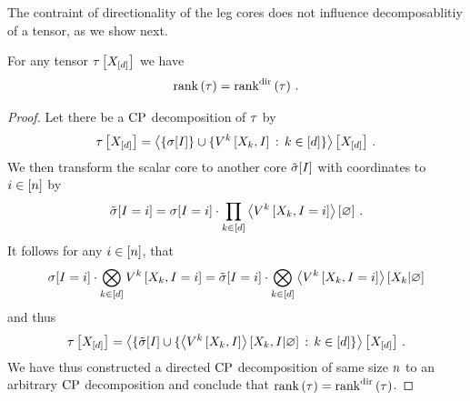 
The contraint of directionality of the leg cores does not influence decomposablitiy of a tensor, as we show next.

\begin{lemma}
    \label{lem:cprankEqualsDir}
    For any tensor $\tau\left[X_{[d]}\right]$ we have
    \begin{align*}
        \mathrm{rank}\left(\tau\right) = \mathrm{rank}^{\mathrm{dir}}\left(\tau\right) \, .
    \end{align*}
\end{lemma}
\begin{proof}
    Let there be a $\mathrm{CP}$ decomposition of $\tau$ by
    \begin{align*}
        \tau\left[X_{[d]}\right]
        = \left\langle 
            \{\sigma[I]\} \cup \{ V^{k}\left[X_{k},I\right] \, : \, k\in[d] \}
        \right\rangle \left[ X_{[d]} \right] \, .
    \end{align*}
    We then transform the scalar core to another core $\tilde{\sigma}[I]$ with coordinates to $i\in[n]$ by
    \begin{align*}
        \tilde{\sigma}[I=i]
        = \sigma[I=i] \cdot \prod_{k\in[d]} \left\langle V^{k}\left[X_{k},I=i\right]\right\rangle \left[ \varnothing \right] \, .
    \end{align*}
    It follows for any $i\in[n]$, that
    \begin{align*}
        \sigma[I=i] \cdot \bigotimes_{k\in[d]}V^{k}\left[X_{k},I=i\right]
        = \tilde{\sigma}[I=i] \cdot \bigotimes_{k\in[d]}\left\langle V^{k}\left[X_{k},I=i\right]\right\rangle \left[ X_{k} | \varnothing \right]
    \end{align*}
    and thus
    \begin{align*}
        \tau\left[X_{[d]}\right]
        = \left\langle 
            \{\tilde{\sigma}[I] \cup \{ \left\langle V^{k}\left[X_{k},I\right]\right\rangle \left[ X_{k},I | \varnothing \right] \, : \, k\in[d] \}
        \right\rangle \left[ X_{[d]} \right] \, .
    \end{align*}
    We have thus constructed a directed $\mathrm{CP}$ decomposition of same size $n$ to an arbitrary $\mathrm{CP}$ decomposition and conclude that $\mathrm{rank}\left(\tau\right) = \mathrm{rank}^{\mathrm{dir}}\left(\tau\right)$.
\end{proof}

